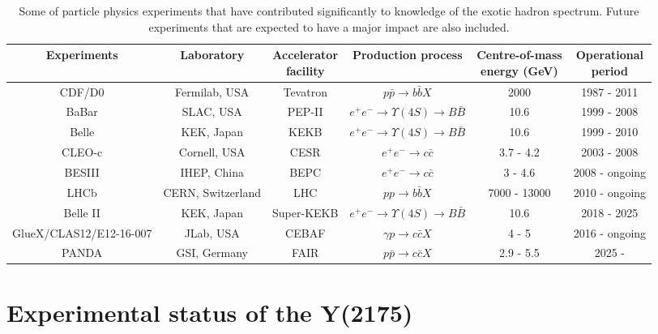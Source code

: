 \begin{landscape}
    \vspace*{\fill}   
\begin{table}[H]
    \centering
    \small
    \setlength{\tabcolsep}{3pt}
    \caption{Some of particle physics experiments that have contributed significantly to knowledge of the exotic hadron spectrum. Future experiments that are expected to have a major impact are also included.}
    \label{tab.1.3}
    \begin{tabular}{cccccc}
        \hline
        Experiments & Laboratory & \thead{Accelerator \\ facility} & Production process & \thead{Centre-of-mass\\energy (GeV)} & \thead{Operational \\ period} \\
        \hline
        CDF/D0 & Fermilab, USA & Tevatron & $p\bar{p} \rightarrow b\bar{b}X$ & 2000 & 1987 - 2011 \\
        BaBar & SLAC, USA & PEP-II & $e^{+}e^{-} \rightarrow \Upsilon(4S) \rightarrow B\bar{B}$ & 10.6 & 1999 - 2008 \\
        Belle & KEK, Japan & KEKB & $e^{+}e^{-} \rightarrow \Upsilon(4S) \rightarrow B\bar{B}$ & 10.6 & 1999 - 2010 \\
        CLEO-c & Cornell, USA & CESR & $e^{+}e^{-} \rightarrow c\bar{c}$ & 3.7 - 4.2 & 2003 - 2008 \\
        BESIII & IHEP, China & BEPC & $e^{+}e^{-} \rightarrow  c\bar{c}$ & 3 - 4.6 & 2008 - ongoing \\
        LHCb & CERN, Switzerland & LHC & $pp \rightarrow b\bar{b}X$ & 7000 - 13000 & 2010 - ongoing \\
        Belle II & KEK, Japan & Super-KEKB & $e^{+}e^{-} \rightarrow \Upsilon(4S) \rightarrow B\bar{B}$ & 10.6 & 2018 - 2025 \\
        GlueX/CLAS12/E12-16-007 & JLab, USA & CEBAF & $\gamma p \rightarrow c\bar{c} X$ & 4 - 5 & 2016 - ongoing \\
        PANDA & GSI, Germany & FAIR & $p\bar{p} \rightarrow c\bar{c} X$ & 2.9 - 5.5 & 2025 -  \\
        \hline
    \end{tabular}
\end{table}
\vspace*{\fill}
\end{landscape}

\section{Experimental status of the Y(2175)}
\label{p.1.4}

